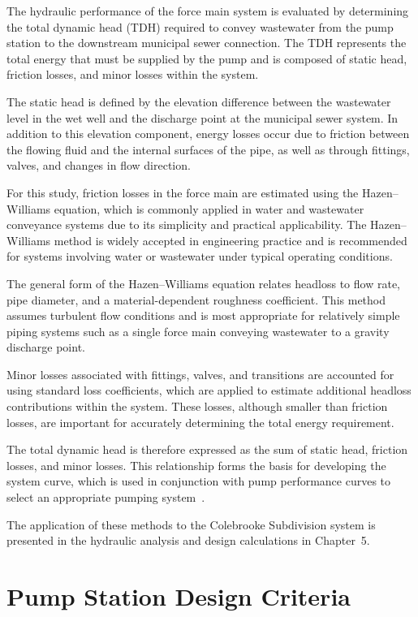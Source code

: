 The hydraulic performance of the force main system is evaluated by determining the total dynamic head (TDH) required to convey wastewater from the pump station to the downstream municipal sewer connection. The TDH represents the total energy that must be supplied by the pump and is composed of static head, friction losses, and minor losses within the system.

The static head is defined by the elevation difference between the wastewater level in the wet well and the discharge point at the municipal sewer system. In addition to this elevation component, energy losses occur due to friction between the flowing fluid and the internal surfaces of the pipe, as well as through fittings, valves, and changes in flow direction.

For this study, friction losses in the force main are estimated using the Hazen--Williams equation, which is commonly applied in water and wastewater conveyance systems due to its simplicity and practical applicability. The Hazen--Williams method is widely accepted in engineering practice and is recommended for systems involving water or wastewater under typical operating conditions.

The general form of the Hazen--Williams equation relates headloss to flow rate, pipe diameter, and a material-dependent roughness coefficient. This method assumes turbulent flow conditions and is most appropriate for relatively simple piping systems such as a single force main conveying wastewater to a gravity discharge point.

Minor losses associated with fittings, valves, and transitions are accounted for using standard loss coefficients, which are applied to estimate additional headloss contributions within the system. These losses, although smaller than friction losses, are important for accurately determining the total energy requirement.

The total dynamic head is therefore expressed as the sum of static head, friction losses, and minor losses. This relationship forms the basis for developing the system curve, which is used in conjunction with pump performance curves to select an appropriate pumping system~\cite{Jensen_PumpStationDesignGuidelines_2012}.

The application of these methods to the Colebrooke Subdivision system is presented in the hydraulic analysis and design calculations in Chapter~5.



\section{Pump Station Design Criteria}

